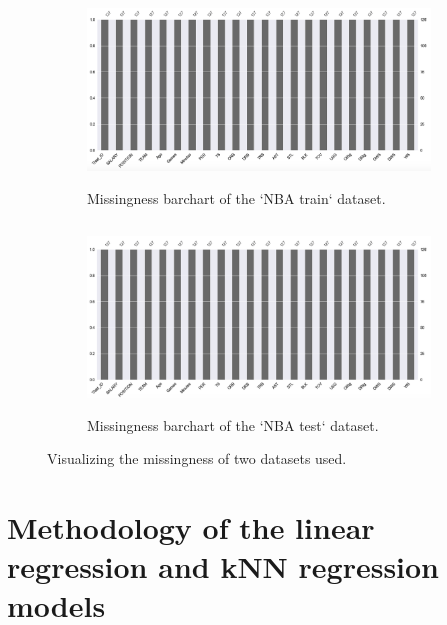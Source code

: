\documentclass[letterpaper,12pt,twoside,]{pinp}
\begin{document}
\begin{figure}[H]
\begin{subfigure}{0.55\textwidth}
\includegraphics[width=0.9\linewidth, height=5cm]{nbaTrain_miss.png} 
\caption{Missingness barchart of the `NBA train` dataset.}
\label{fig:trainMiss}
\end{subfigure}
\begin{subfigure}{0.55\textwidth}
\includegraphics[width=0.9\linewidth, height=5cm]{nbaTest_miss.png}
\caption{Missingness barchart of the `NBA test` dataset.}
\label{fig:testMiss}
\end{subfigure}
\caption{Visualizing the missingness of two datasets used.}
\label{fig:missingness}
\end{figure}

\hypertarget{methodology-of-the-linear-regression-and-knn-regression-models}{%
\section{Methodology of the linear regression and kNN regression
models}\label{methodology-of-the-linear-regression-and-knn-regression-models}}
\end{document}
